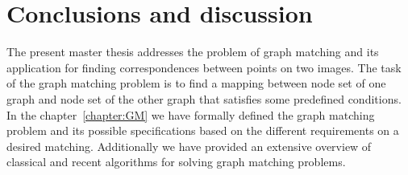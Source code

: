 \chapter{Conclusions and discussion} \label{chapter:conclusions}
The present master thesis addresses the problem of graph matching and its application for finding correspondences between points on two images. The task of the graph matching problem is to find a mapping between node set of one graph and node set of the other graph that satisfies some predefined conditions. In the chapter~\ref{chapter:GM} we have formally defined the graph matching problem and its possible specifications based on the different requirements on a desired matching. Additionally we have provided an extensive overview of classical and recent algorithms for solving graph matching problems. 

